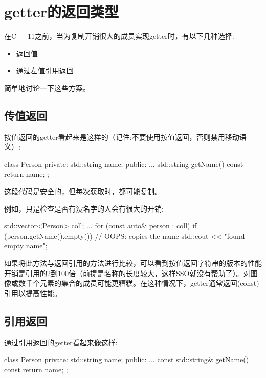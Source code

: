 \section{getter的返回类型}
在C++11之前，当为复制开销很大的成员实现getter时，有以下几种选择:

\begin{itemize}
	\item 返回值
	\item 通过左值引用返回
\end{itemize}

简单地讨论一下这些方案。

\subsection{传值返回}

按值返回的getter看起来是这样的（记住:不要使用按值返回，否则禁用移动语义）:

\begin{cppcode}
class Person
{
private:
	std::string name;
public:
	...
	std::string getName() const {
		return name;
	}
};
\end{cppcode}

这段代码是安全的，但每次获取时，都可能复制。

例如，只是检查是否有没名字的人会有很大的开销:

\begin{cppcode}
std::vector<Person> coll;
...
for (const auto& person : coll) {
	if (person.getName().empty()) { // OOPS: copies the name
		std::cout << "found empty name\n";
	}
}
\end{cppcode}

如果将此方法与返回引用的方法进行比较，可以看到按值返回字符串的版本的性能开销是引用的2到100倍（前提是名称的长度较大，这样SSO就没有帮助了）。对图像或数千个元素的集合的成员可能更糟糕。在这种情况下，getter通常返回(const)引用以提高性能。

\subsection{引用返回}

通过引用返回的getter看起来像这样:

\begin{cppcode}
class Person
{
private:
	std::string name;
public:
	...
	const std::string& getName() const {
		return name;
	}
};
\end{cppcode}

